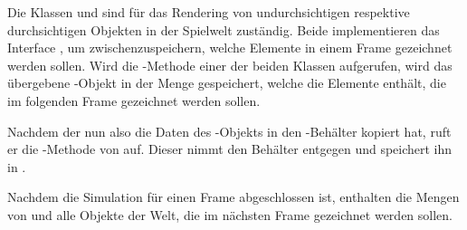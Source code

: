 Die Klassen \classOpaqueMasterRenderer{} und \classTransparentMasterRenderer{} sind für das Rendering von undurchsichtigen respektive durchsichtigen Objekten in der Spielwelt zuständig. Beide implementieren das Interface \classDoubleBuffer{}, um zwischenzuspeichern, welche Elemente in einem Frame gezeichnet werden sollen. Wird die -Methode einer der beiden Klassen aufgerufen, wird das übergebene \classRenderable{}-Objekt in der Menge  gespeichert, welche die Elemente enthält, die im folgenden Frame gezeichnet werden sollen. 

\begin{example}
	Nachdem der \classMasterRenderer{} nun also die Daten des \classPlayer{}-Objekts in den \classRenderedRenderable{}-Behälter kopiert hat, ruft er die -Methode von \classOpaqueMasterRenderer{} auf. Dieser nimmt den Behälter entgegen und speichert ihn in .
\end{example}

Nachdem die Simulation für einen Frame abgeschlossen ist, enthalten die  Mengen von \classOpaqueMasterRenderer{} und \classTransparentMasterRenderer{} alle Objekte der Welt, die im nächsten Frame gezeichnet werden sollen. 


